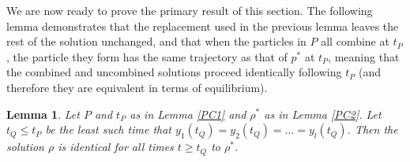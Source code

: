 \documentclass[11pt]{article}
\newtheorem{lemma}[theorem]{Lemma}
\numberwithin{equation}{section}
\begin{document}
    We are now ready to prove the primary result of this section. The following lemma demonstrates that the replacement used in the previous lemma leaves the rest of the solution unchanged, and that when the particles in $P$ all combine at $t_P$, the particle they form has the same trajectory as that of $p^*$ at $t_P$, meaning that the combined and uncombined solutions proceed identically following $t_P$ (and therefore they are equivalent in terms of equilibrium).
    \begin{lemma} \label{PC}
        Let $P$ and $t_P$ as in Lemma \ref{PC1} and $\rho^*$ as in Lemma \ref{PC2}. Let $t_Q \le t_P$ be the least such time that $y_1(t_Q) = y_2(t_Q) = \ldots=y_l(t_Q)$. Then the solution $\rho$ is identical for all times $t \ge t_Q$ to $\rho^*$.
    \end{lemma}
\end{document}
